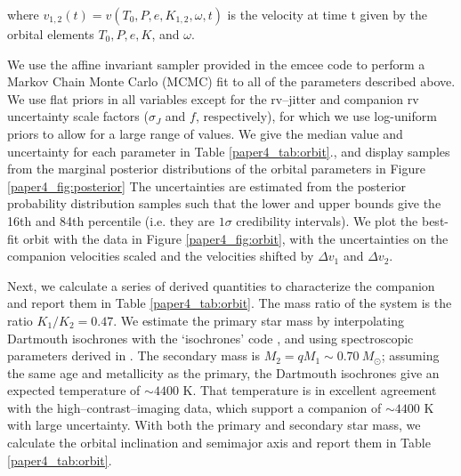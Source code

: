 where $v_{1,2}(t) = v(T_0, P, e, K_{1,2}, \omega, t)$ is the velocity at time t given by the orbital elements $T_0, P, e, K$, and $\omega$.

We use the affine invariant sampler provided in the emcee code \citep{emcee} to perform a Markov Chain Monte Carlo (MCMC) fit to all of the parameters described above. We use flat priors in all variables except for the rv--jitter and companion rv uncertainty scale factors ($\sigma_J$ and $f$, respectively), for which we use log-uniform priors to allow for a large range of values.  We give the median value and uncertainty for each parameter in Table \ref{paper4_tab:orbit}., and display samples from the marginal posterior distributions of the orbital parameters in Figure \ref{paper4_fig:posterior} The uncertainties are estimated from the posterior probability distribution samples such that the lower and upper bounds give the 16th and 84th percentile (i.e. they are $1\sigma$ credibility intervals). We plot the best-fit orbit with the data in Figure \ref{paper4_fig:orbit}, with the uncertainties on the companion velocities scaled and the velocities shifted by $\Delta v_1$ and $\Delta v_2$. 

Next, we calculate a series of derived quantities to characterize the companion and report them in Table \ref{paper4_tab:orbit}. The mass ratio of the system is the ratio $K_1/K_2 = 0.47$. We estimate the primary star mass by interpolating Dartmouth isochrones \citep{Dotter2008} with the `isochrones' code \citep[described in][]{Montet2015}, and using spectroscopic parameters derived in \citet{Endl2015}. The secondary mass is $M_2 = qM_1 \sim 0.70\ M_{\odot}$; assuming the same age and metallicity as the primary, the Dartmouth isochrones give an expected temperature of ${\sim}4400 $ K. That temperature is in excellent agreement with the high--contrast--imaging data, which support a companion of ${\sim}4400$ K with large uncertainty. With both the primary and secondary star mass, we calculate the orbital inclination and semimajor axis and report them in Table \ref{paper4_tab:orbit}.

